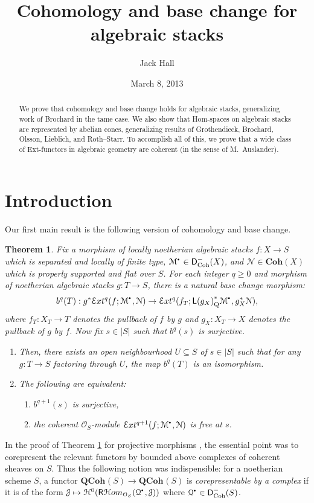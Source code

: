 \documentclass{amsart}
\title{Cohomology and base change for algebraic stacks}
\author{Jack Hall}
\date{March 8, 2013}
\theoremstyle{plain}
\newtheorem{mainthm}{Theorem}
\theoremstyle{definition}
\theoremstyle{remark}
\numberwithin{equation}{section}
\newcommand{\Orb}{\mathcal{O}}
\newcommand{\COH}[1]{\mathbf{Coh}({#1})}
\newcommand{\QCOHB}{\mathbf{QCoh}}
\newcommand{\QCOH}[2][]{\QCOHB^{#1}({#2})}
\newcommand{\SRExt}[4]{\SExt^{{#1}}({#2};{#3},{#4})}
\newcommand{\COHO}[1]{\mathcal{H}^{{#1}}}
\newcommand{\RDERF}{\mathsf{R}}
\newcommand{\LDERF}{\mathsf{L}}
\newcommand{\DCAT}{\mathsf{D}}
\newcommand{\SHom}{\mathcal{H}om}
\newcommand{\SRHom}{\RDERF\SHom}
\newcommand{\shv}[1]{\mathcal{{#1}}}
\newcommand{\fndefn}[1]{\emph{{#1}}}
\newcommand{\SExt}{\mathcal{E}xt}
\newcommand{\QCPBK}[1]{{#1}_{\mathrm{Q}}^*}
\newcommand{\DCOH}{\DCAT_{\mathrm{Coh}}}
\newcommand{\sbt}{\,\begin{picture}(-1,-1)(0,-2)\circle*{1.5}\end{picture}\ }
\newcommand{\cplx}[1]{\shv{{#1}}^{\sbt}}
\begin{document}
\begin{abstract} 
  We prove that cohomology and base change holds for algebraic stacks, generalizing work of Brochard in the tame case. We also show that Hom-spaces on algebraic stacks are represented by abelian cones, generalizing results of Grothendieck, Brochard, Olsson, Lieblich, and Roth--Starr. To accomplish all of this, we prove that a wide class of Ext-functors in algebraic geometry are coherent (in the sense of M.~Auslander).
\end{abstract}
\address{Department of Mathematics, KTH, 100 44 Stockholm, Sweden}
\maketitle
\section*{Introduction}
Our first main result is the following version of
cohomology and base change.
\begin{mainthm}\label{mainthm:cohobc}
  Fix a morphism of locally noetherian algebraic stacks $f : X \to S$
  which is separated and locally of finite type, $\cplx{M} \in
  \DCOH^-(X)$, and $\shv{N} \in \COH{X}$ which is properly supported
  and flat over $S$. For each integer $q\geq 0$ and morphism of
  noetherian algebraic stacks $g : T \to S$, there is a
  natural base change morphism:
  \[
  b^q(T) : g^*\SRExt{q}{f}{\cplx{M}}{\shv{N}} \to \SRExt{q}{f_T}{\LDERF \QCPBK{(g_X)}\cplx{M}}{g_X^*\shv{N}},
  \]
  where $f_T : X_T \to T$  denotes the pullback of $f$ by $g$ and $g_X
  : X_T \to X$ denotes the pullback of $g$ by $f$. Now fix $s\in |S|$ such that $b^q(s)$ is surjective. 
  \begin{enumerate}
  \item Then, there exists an open neighbourhood $U \subseteq S$
    of $s\in |S|$ such that for any $g : T \to S$ factoring through
    $U$, the map $b^q(T)$ is an isomorphism.
  \item The following are equivalent:
    \begin{enumerate}
    \item $b^{q+1}(s)$ is surjective,
    \item the coherent $\Orb_S$-module
      $\SRExt{q+1}{f}{\cplx{M}}{\shv{N}}$ is free at $s$. 
    \end{enumerate}
  \end{enumerate}
\end{mainthm}
In the proof of Theorem \ref{mainthm:cohobc} for projective morphisms
\cite[III.7.7.5]{EGA}, the 
essential point was to corepresent the 
relevant functors by bounded above complexes of coherent sheaves on
$S$. Thus the following notion was indispensible: for a 
noetherian scheme $S$, a functor $\QCOH{S} \to \QCOH{S}$ is
\fndefn{corepresentable by a complex} if it is of the form $\shv{J}
\mapsto \COHO{0}(\SRHom_{\Orb_S}(\cplx{Q},\shv{J}))$ where $\cplx{Q} \in
\DCOH^-(S)$. 
\end{document}
